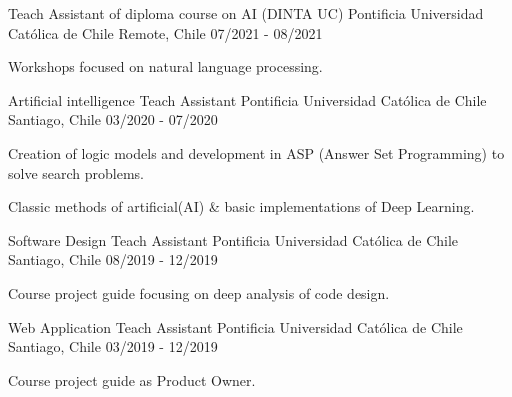 \begin{cventries}
  
  \newline
  \cventry
  {Teach Assistant of diploma course on AI (DINTA UC)} %
  {Pontificia Universidad Católica de Chile} %
  {Remote, Chile} %
  {07/2021 - 08/2021} %
  {
    \begin{cvitems} %
      \item {Workshops focused on natural language processing.}
    \end{cvitems}
  }
  \newline
  \cventry
  {Artificial intelligence Teach Assistant} %
  {Pontificia Universidad Católica de Chile} %
  {Santiago, Chile} %
  {03/2020 - 07/2020} %
  {
    \begin{cvitems} %
      \item {Creation of logic models and development in ASP (Answer Set Programming) to solve search problems.}
      \item {Classic methods of artificial(AI) \& basic implementations of Deep Learning.}
    \end{cvitems}
  }
  \newline

  \cventry
  {Software Design Teach Assistant} %
  {Pontificia Universidad Católica de Chile} %
  {Santiago, Chile} %
  {08/2019 - 12/2019} %
  {
    \begin{cvitems} %
      \item {Course project guide focusing on deep analysis of code design. }
    \end{cvitems}
  }
  \newline

  \cventry
  {Web Application Teach Assistant} %
  {Pontificia Universidad Católica de Chile} %
  {Santiago, Chile} %
  {03/2019 - 12/2019} %
  {
    \begin{cvitems} %
      \item {Course project guide as Product Owner.}
    \end{cvitems}
  }
  \newline
\end{cventries}
